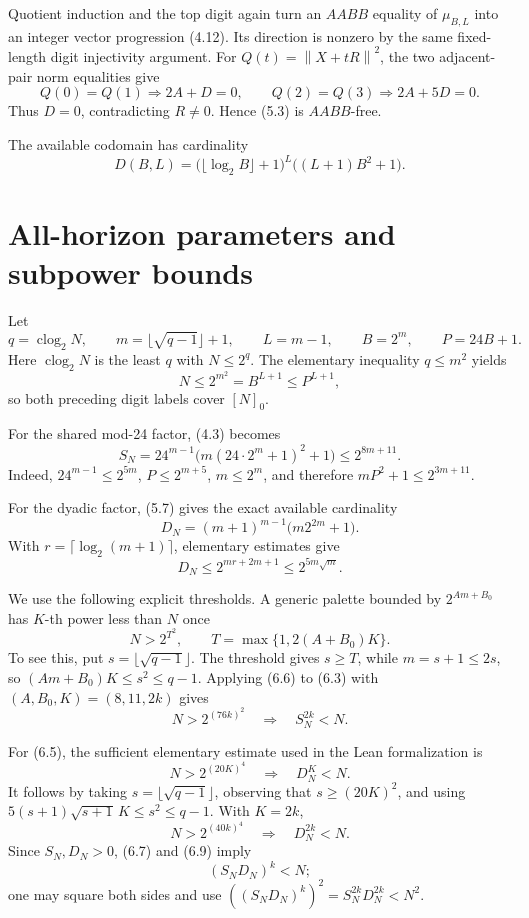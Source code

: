 \documentclass[11pt]{article}
\theoremstyle{definition}
\newcommand{\norm}[1]{\left\lVert #1\right\rVert}
\newcommand{\clog}{\operatorname{clog}_2}
\begin{document}
Quotient induction and the top digit again turn an \(AABB\) equality of
\(\mu_{B,L}\) into an integer vector progression (4.12).  Its direction is
nonzero by the same fixed-length digit injectivity argument.  For
\(Q(t)=\norm{X+tR}^2\), the two adjacent-pair norm equalities give
\[
 Q(0)=Q(1)\Longrightarrow2A+D=0,\qquad
 Q(2)=Q(3)\Longrightarrow2A+5D=0.
 \tag{5.6}
\]
Thus \(D=0\), contradicting \(R\ne0\).  Hence (5.3) is \(AABB\)-free.

The available codomain has cardinality
\[
 D(B,L)=\bigl(\lfloor\log_2B\rfloor+1\bigr)^L
         \bigl((L+1)B^2+1\bigr).
 \tag{5.7}
\]

\section{All-horizon parameters and subpower bounds}

Let
\[
 q=\clog N,\qquad
 m=\lfloor\sqrt{q-1}\rfloor+1,\qquad
 L=m-1,\qquad B=2^m,\qquad P=24B+1.
 \tag{6.1}
\]
Here \(\clog N\) is the least \(q\) with \(N\leq2^q\).  The elementary
inequality \(q\leq m^2\) yields
\[
 N\leq2^{m^2}=B^{L+1}\leq P^{L+1},
 \tag{6.2}
\]
so both preceding digit labels cover \([N]_0\).

For the shared mod-24 factor, (4.3) becomes
\[
 S_N=24^{m-1}\bigl(m(24\cdot2^m+1)^2+1\bigr)
     \leq2^{8m+11}.
 \tag{6.3}
\]
Indeed, \(24^{m-1}\leq2^{5m}\),
\(P\leq2^{m+5}\), \(m\leq2^m\), and therefore
\(mP^2+1\leq2^{3m+11}\).

For the dyadic factor, (5.7) gives the exact available cardinality
\[
 D_N=(m+1)^{m-1}\bigl(m2^{2m}+1\bigr).
 \tag{6.4}
\]
With \(r=\lceil\log_2(m+1)\rceil\), elementary estimates give
\[
 D_N\leq2^{mr+2m+1}\leq2^{5m\sqrt m}.
 \tag{6.5}
\]

We use the following explicit thresholds.  A generic palette bounded by
\(2^{Am+B_0}\) has \(K\)-th power
less than \(N\) once
\[
 N>2^{T^2},\qquad T=\max\{1,2(A+B_0)K\}.
 \tag{6.6}
\]
To see this, put \(s=\lfloor\sqrt{q-1}\rfloor\).  The threshold gives
\(s\geq T\), while \(m=s+1\leq2s\), so
\((Am+B_0)K\leq s^2\leq q-1\).  Applying (6.6) to (6.3) with
\((A,B_0,K)=(8,11,2k)\) gives
\[
 N>2^{(76k)^2}\quad\Longrightarrow\quad S_N^{2k}<N.
 \tag{6.7}
\]

For (6.5), the sufficient elementary estimate used in the Lean formalization is
\[
 N>2^{(20K)^4}\quad\Longrightarrow\quad D_N^K<N.
 \tag{6.8}
\]
It follows by taking \(s=\lfloor\sqrt{q-1}\rfloor\), observing that
\(s\geq(20K)^2\), and using
\(5(s+1)\sqrt{s+1}\,K\leq s^2\leq q-1\).
With \(K=2k\),
\[
 N>2^{(40k)^4}\quad\Longrightarrow\quad D_N^{2k}<N.
 \tag{6.9}
\]
Since \(S_N,D_N>0\), (6.7) and (6.9) imply
\[
 (S_ND_N)^k<N;
 \tag{6.10}
\]
one may square both sides and use
\(((S_ND_N)^k)^2=S_N^{2k}D_N^{2k}<N^2\).
\end{document}
